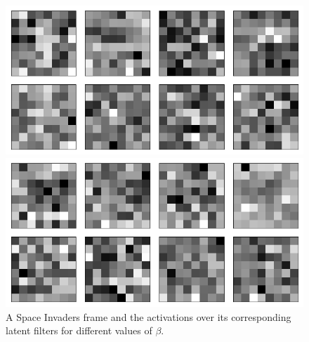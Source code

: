 \begin{figure}[h!]
\begin{minipage}{0.55\textwidth}
\caption{$\beta = 1$}
\includegraphics[scale=0.42]{figures/results/indiscriminate_decoupling/beta_2_convolutional_layers_sample_3.png}
\caption{$\beta = 2$}
\includegraphics[scale=0.42]{figures/results/indiscriminate_decoupling/beta_4_convolutional_layers_sample_3.png}
\caption{$\beta = 4$}
\end{minipage}
\caption{A Space Invaders frame and the activations over its corresponding latent filters for different values of $\beta$.}
\label{fig:indiscriminate_decoupling_originals_and_latent_filters}
\end{figure}


